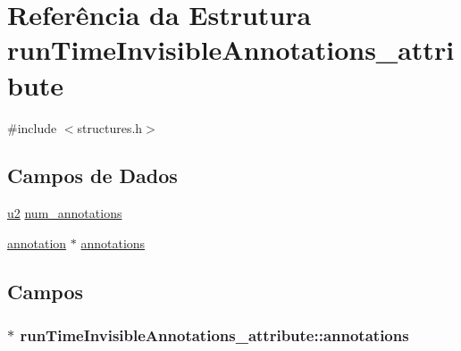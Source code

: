 \hypertarget{structrunTimeInvisibleAnnotations__attribute}{}\section{Referência da Estrutura run\+Time\+Invisible\+Annotations\+\_\+attribute}
\label{structrunTimeInvisibleAnnotations__attribute}


{\ttfamily \#include $<$structures.\+h$>$}

\subsection*{Campos de Dados}
\begin{DoxyCompactItemize}
\item 
\hyperlink{lista__operandos_8h_a732cde1300aafb73b0ea6c2558a7a54f}{u2} \hyperlink{structrunTimeInvisibleAnnotations__attribute_a703d15c7112b673ff31b7e4b2d85782b}{num\+\_\+annotations}
\item 
\hyperlink{structannotation}{annotation} $\ast$ \hyperlink{structrunTimeInvisibleAnnotations__attribute_a8f62eb72b381abe0fcc559ad874cf60b}{annotations}
\end{DoxyCompactItemize}


\subsection{Campos}
\subsubsection[{\texorpdfstring{annotations}{annotations}}]{$\ast$ run\+Time\+Invisible\+Annotations\+\_\+attribute\+::annotations}\hypertarget{structrunTimeInvisibleAnnotations__attribute_a8f62eb72b381abe0fcc559ad874cf60b}{}\label{structrunTimeInvisibleAnnotations__attribute_a8f62eb72b381abe0fcc559ad874cf60b}
